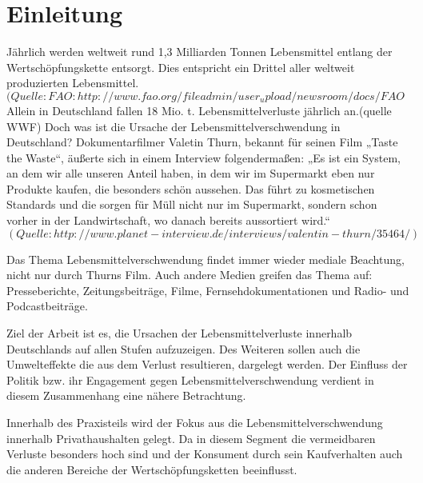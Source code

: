 \section{Einleitung}
Jährlich werden weltweit rund 1,3 Milliarden Tonnen Lebensmittel entlang der Wertschöpfungskette entsorgt. Dies entspricht ein Drittel aller weltweit produzierten Lebensmittel. $ (Quelle: FAO: http://www.fao.org/fileadmin/user_upload/newsroom/docs/FAO%
$
Allein in Deutschland fallen 18 Mio. t. Lebensmittelverluste jährlich an.(quelle WWF) Doch was ist die Ursache der Lebensmittelverschwendung in Deutschland? Dokumentarfilmer Valetin Thurn, bekannt für seinen Film „Taste the Waste“, äußerte sich in einem Interview folgendermaßen: „Es ist ein System, an dem wir alle unseren Anteil haben, in dem wir im Supermarkt eben nur Produkte kaufen, die besonders schön aussehen. Das führt zu kosmetischen Standards und die sorgen für Müll nicht nur im Supermarkt, sondern schon vorher in der Landwirtschaft, wo danach bereits aussortiert wird.“ $ (Quelle: http://www.planet-interview.de/interviews/valentin-thurn/35464/) $

Das Thema Lebensmittelverschwendung findet immer wieder mediale Beachtung, nicht nur durch Thurns Film. Auch andere Medien greifen das Thema auf: Presseberichte, Zeitungsbeiträge, Filme, Fernsehdokumentationen und Radio- und Podcastbeiträge.


Ziel der Arbeit ist es, die Ursachen der Lebensmittelverluste innerhalb Deutschlands auf allen Stufen aufzuzeigen. Des Weiteren sollen auch die Umwelteffekte die aus dem Verlust resultieren, dargelegt werden. Der Einfluss der Politik bzw. ihr Engagement gegen Lebensmittelverschwendung verdient in diesem Zusammenhang eine nähere Betrachtung.

Innerhalb des Praxisteils wird der Fokus aus die Lebensmittelverschwendung innerhalb Privathaushalten gelegt. Da in diesem Segment die vermeidbaren Verluste besonders hoch sind und der Konsument durch sein Kaufverhalten auch die anderen Bereiche der Wertschöpfungsketten beeinflusst. 
